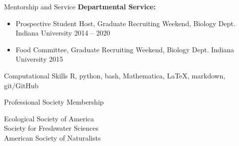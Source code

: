 \documentclass{resume} %
\begin{document}
\begin{rSection}{Mentorship and Service}
{\bf Departmental Service:}
\begin{itemize}
  \item Prospective Student Host, Graduate Recruiting Weekend, Biology Dept. Indiana University \hfill 2014 -- 2020
  \item Food Committee, Graduate Recruiting Weekend, Biology Dept. Indiana University \hfill 2015 
\end{itemize}


\end{rSection}
\bigskip

\begin{rSection}{Computational Skills}
R, python, bash, Mathematica, \LaTeX, markdown, git/GitHub 

\end{rSection}

\bigskip

\begin{rSection}{Professional Society Membership}

Ecological Society of America\\
Society for Freshwater Sciences\\
American Society of Naturalists\\ 

\end{rSection}

% 
% 
% 
% 
\end{document}
